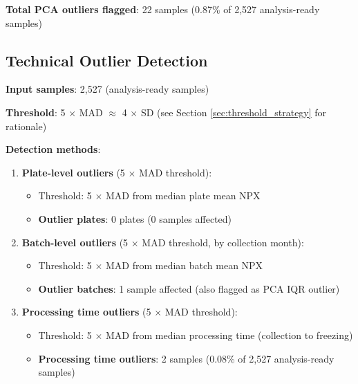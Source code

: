 \documentclass[11pt,a4paper]{article}
\begin{document}
\textbf{Total PCA outliers flagged}: 22 samples (0.87\% of 2,527 analysis-ready samples)

\subsection{Technical Outlier Detection}
\textbf{Input samples}: 2,527 (analysis-ready samples)

\textbf{Threshold}: 5 $\times$ MAD $\approx$ 4 $\times$ SD (see Section \ref{sec:threshold_strategy} for rationale)

\textbf{Detection methods}:

\begin{enumerate}
    \item \textbf{Plate-level outliers} (5 $\times$ MAD threshold):
   \begin{itemize}
     \item Threshold: 5 $\times$ MAD from median plate mean NPX
     \item \textbf{Outlier plates}: 0 plates (0 samples affected)
   \end{itemize}

\item \textbf{Batch-level outliers} (5 $\times$ MAD threshold, by collection month):
   \begin{itemize}
     \item Threshold: 5 $\times$ MAD from median batch mean NPX
     \item \textbf{Outlier batches}: 1 sample affected (also flagged as PCA IQR outlier)
   \end{itemize}

\item \textbf{Processing time outliers} (5 $\times$ MAD threshold):
   \begin{itemize}
     \item Threshold: 5 $\times$ MAD from median processing time (collection to freezing)
     \item \textbf{Processing time outliers}: 2 samples (0.08\% of 2,527 analysis-ready samples)
   \end{itemize}


\end{enumerate}
\end{document}
